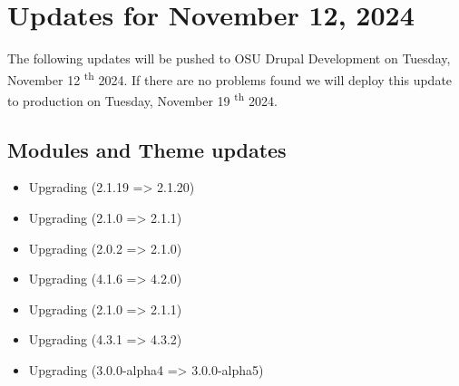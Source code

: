 \section{Updates for November 12, 2024}
The following updates will be pushed to OSU Drupal Development on Tuesday, November 12 \textsuperscript{th} 2024.
If there are no problems found we will deploy this update to production on Tuesday, November 19 \textsuperscript{th} 2024.
\subsection{Modules and Theme updates}
\begin{itemize}
    \item Upgrading  (2.1.19 => 2.1.20)
    \item Upgrading  (2.1.0 => 2.1.1)
    \item Upgrading  (2.0.2 => 2.1.0)
    \item Upgrading  (4.1.6 => 4.2.0)
    \item Upgrading  (2.1.0 => 2.1.1)
    \item Upgrading  (4.3.1 => 4.3.2)
    \item Upgrading  (3.0.0-alpha4 => 3.0.0-alpha5)
\end{itemize}
